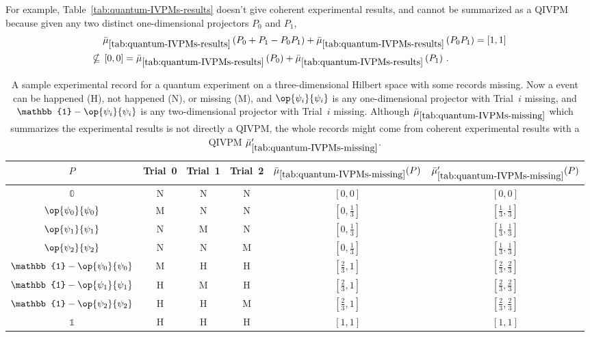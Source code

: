 \documentclass[english,reprint, aps, prl,superscriptaddress, showpacs,
showkeys, longbibliography, amsmath, amssymb, floatfix]{revtex4-1}
\theoremstyle{plain}
\theoremstyle{definition}
\newcommand{\imposs}{\ensuremath{\left[0,0\right]}}
\newcommand{\necess}{\ensuremath{\left[1,1\right]}}
\newcommand{\proj}[1]{\op{#1}{#1}}
\newcommand{\happen}{\text{H}}
\newcommand{\notHappen}{\text{N}}
\newcommand{\missing}{\text{M}}
\begin{document}
For example, Table~\ref{tab:quantum-IVPMs-results} doesn't give
coherent experimental results, and cannot be summarized as a QIVPM
because given any two distinct one-dimensional projectors $P_{0}$
and $P_{1}$, 
\begin{equation}
\begin{aligned} & \bar{\mu}_{\ref{tab:quantum-IVPMs-results}}\left(P_{0}+P_{1}-P_{0}P_{1}\right)+\bar{\mu}_{\ref{tab:quantum-IVPMs-results}}\left(P_{0}P_{1}\right)=\necess\\
\nsubseteq{} & \imposs=\bar{\mu}_{\ref{tab:quantum-IVPMs-results}}\left(P_{0}\right)+\bar{\mu}_{\ref{tab:quantum-IVPMs-results}}\left(P_{1}\right)\,.
\end{aligned}
\end{equation}

\begin{table}
\noindent \centering{}\caption{\label{tab:quantum-IVPMs-missing}A sample experimental record for
a quantum experiment on a three-dimensional Hilbert space with some
records missing. Now a event can be happened ($\happen$), not happened
($\notHappen$), or missing ($\missing$), and $\proj{\psi_{i}}$
is any one-dimensional projector with Trial~$i$ missing, and $\mathbb{1}-\proj{\psi_{i}}$
is any two-dimensional projector with Trial~$i$ missing. Although
$\bar{\mu}_{\ref{tab:quantum-IVPMs-missing}}$ which summarizes the
experimental results is not directly a QIVPM, the whole records might
come from coherent experimental results with a QIVPM $\bar{\mu}_{\ref{tab:quantum-IVPMs-missing}}'$.}
\begin{tabular}{cccccc}
\toprule 
\addlinespace
$P$  & Trial~0 & Trial~1 & Trial~2 & $\bar{\mu}_{\ref{tab:quantum-IVPMs-missing}}(P)$ & $\bar{\mu}_{\ref{tab:quantum-IVPMs-missing}}'(P)$\tabularnewline
\midrule
\midrule 
\addlinespace
$\mathbb{0}$  & $\notHappen$ & $\notHappen$ & $\notHappen$ & $\imposs$ & $\imposs$\tabularnewline
\midrule 
\addlinespace
$\proj{\psi_{0}}$  & $\missing$ & $\notHappen$ & $\notHappen$ & $\left[0,\frac{1}{3}\right]$ & $\left[\frac{1}{3},\frac{1}{3}\right]$\tabularnewline
\midrule 
\addlinespace
$\proj{\psi_{1}}$  & $\notHappen$ & $\missing$ & $\notHappen$ & $\left[0,\frac{1}{3}\right]$ & $\left[\frac{1}{3},\frac{1}{3}\right]$\tabularnewline
\midrule 
\addlinespace
$\proj{\psi_{2}}$  & $\notHappen$ & $\notHappen$ & $\missing$ & $\left[0,\frac{1}{3}\right]$ & $\left[\frac{1}{3},\frac{1}{3}\right]$\tabularnewline
\midrule 
\addlinespace
$\mathbb{1}-\proj{\psi_{0}}$  & $\missing$ & $\happen$ & $\happen$ & $\left[\frac{2}{3},1\right]$ & $\left[\frac{2}{3},\frac{2}{3}\right]$\tabularnewline
\midrule 
\addlinespace
$\mathbb{1}-\proj{\psi_{1}}$  & $\happen$ & $\missing$ & $\happen$ & $\left[\frac{2}{3},1\right]$ & $\left[\frac{2}{3},\frac{2}{3}\right]$\tabularnewline
\midrule 
\addlinespace
$\mathbb{1}-\proj{\psi_{2}}$  & $\happen$ & $\happen$ & $\missing$ & $\left[\frac{2}{3},1\right]$ & $\left[\frac{2}{3},\frac{2}{3}\right]$\tabularnewline
\midrule 
\addlinespace
$\mathbb{1}$  & $\happen$ & $\happen$ & $\happen$ & $\necess$ & $\necess$\tabularnewline
\bottomrule
\end{tabular}
\end{table}
\end{document}
